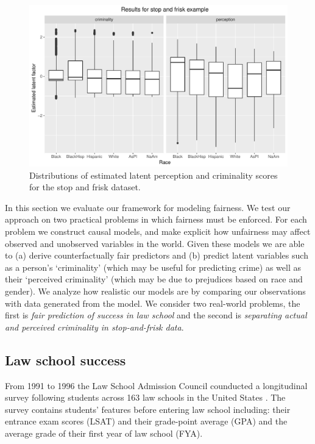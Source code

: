 
\begin{figure}[!th]
\begin{center}
\vspace{-1ex}
\centerline{\includegraphics[width=\columnwidth]{stopandfrisk_output.pdf}}
\vspace{-2ex}
\caption{Distributions of estimated latent perception and criminality scores for the stop and frisk dataset.\label{figure.stop_and_frisk_output}\vspace{-5ex}}
\vspace{-2ex}
\end{center}
\end{figure}

In this section we evaluate our framework for modeling fairness. We test our approach on two practical problems in which fairness must be enforced. For each problem we construct causal models, and make explicit how unfairness may affect observed and unobserved variables in the world. Given these models we are able to (a) derive counterfactually fair predictors and (b) predict latent variables such as a person's `criminality' (which may be useful for predicting crime) as well as their `perceived criminality' (which may be due to prejudices based on race and gender). We analyze how realistic our models are by comparing our observations with data generated from the model. We consider two real-world problems, the first is \emph{fair prediction of success in law school} and the second is \emph{separating actual and perceived criminality in stop-and-frisk data}.

\subsection{Law school success}
\label{sec:law-school-success}
From 1991 to 1996 the Law School Admission Council
counducted a longitudinal survey following students across 163 law
schools in the United States \cite{wightman1998lsac}. %
The survey contains students' features before entering law school
including: their entrance exam scores (LSAT) and their grade-point
average (GPA) and the average grade of their first year of law school
(FYA). %

